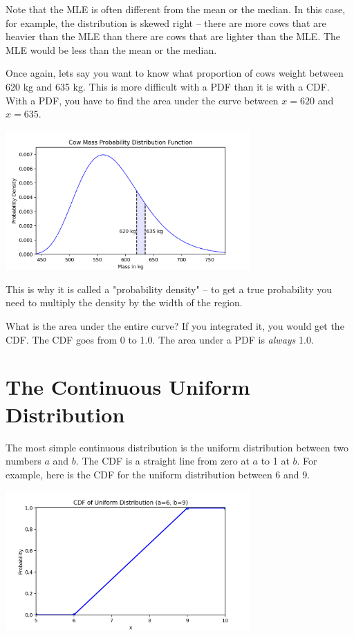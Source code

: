 Note that the MLE is often different from the mean or the median.  In this case, for example,  the distribution is skewed right -- there are more cows that are heavier than the 
MLE than there are cows that are lighter than the MLE.    The MLE would be less than the mean or the median.

Once again,  lets say you want to know what proportion of cows weight between 620 kg and 635 kg.   This is more difficult with a PDF than it is with a CDF.  With a PDF,  you have to find
the area under the curve between $x=620$ and $x=635$.  

\includegraphics[width=0.7\textwidth]{cow_pdf_bounds.png}

This is why it is called a "probability density" -- to get a true probability you need to multiply the density by the width of the region.

What is the area under the entire curve?  If you integrated it, you would get the CDF.  The CDF goes from 0 to 1.0.   The area under a PDF is \emph{always} 1.0.

\section{The Continuous Uniform Distribution}

The most simple continuous distribution is the uniform distribution between two numbers $a$ and $b$.   The CDF is a straight line from zero at $a$ to 1 at $b$.  For example,
here is the CDF for the uniform distribution between 6 and 9.

\includegraphics[width=0.7\textwidth]{unif_cdf.png}

